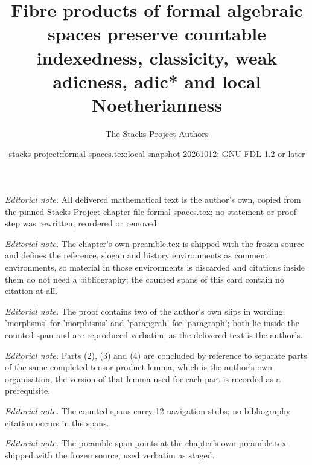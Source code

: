 \documentclass{stacks-project}
\title{Fibre products of formal algebraic spaces preserve countable indexedness, classicity, weak adicness, adic* and local Noetherianness}
\author{The Stacks Project Authors}
\date{stacks-project:formal-spaces.tex:local-snapshot-20261012; GNU FDL 1.2 or later}
\theoremstyle{plain}
\theoremstyle{definition}
\theoremstyle{remark}
\numberwithin{equation}{subsection}
\begin{document}
\maketitle
\noindent\textit{Editorial note.} All delivered mathematical text is the author's own, copied from the pinned Stacks Project chapter file formal-spaces.tex; no statement or proof step was rewritten, reordered or removed.\par\medskip
\noindent\textit{Editorial note.} The chapter's own preamble.tex is shipped with the frozen source and defines the reference, slogan and history environments as comment environments, so material in those environments is discarded and citations inside them do not need a bibliography; the counted spans of this card contain no citation at all.\par\medskip
\noindent\textit{Editorial note.} The proof contains two of the author's own slips in wording, 'morphsms' for 'morphisms' and 'parapgrah' for 'paragraph'; both lie inside the counted span and are reproduced verbatim, as the delivered text is the author's.\par\medskip
\noindent\textit{Editorial note.} Parts (2), (3) and (4) are concluded by reference to separate parts of the same completed tensor product lemma, which is the author's own organisation; the version of that lemma used for each part is recorded as a prerequisite.\par\medskip
\noindent\textit{Editorial note.} The counted spans carry 12 navigation stubs; no bibliography citation occurs in the spans.\par\medskip
\noindent\textit{Editorial note.} The preamble span points at the chapter's own preamble.tex shipped with the frozen source, used verbatim as staged.\par\medskip
\end{document}

